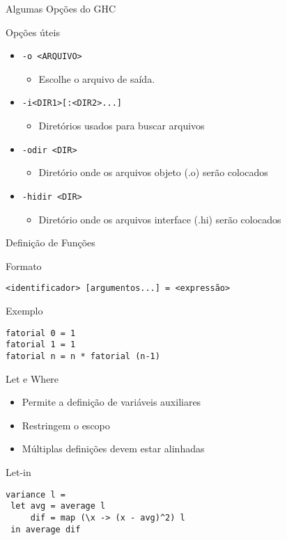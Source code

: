 \documentclass{beamer}
\begin{document}
		 
		 \begin{frame}[fragile]{Algumas Opções do GHC}
		 
		 \begin{block}{Opções úteis}
		  \begin{itemize}
		   \item \verb+-o <ARQUIVO>+
				\begin{itemize}
				 \item Escolhe o arquivo de saída.
				\end{itemize}
		   \item \verb+-i<DIR1>[:<DIR2>...]+		   
				\begin{itemize}
				 \item Diretórios usados para buscar arquivos
				\end{itemize}
		   \item \verb+-odir <DIR>+
				\begin{itemize}
				 \item Diretório onde os arquivos objeto (.o) serão colocados
				\end{itemize}
			\item \verb+-hidir <DIR>+
				\begin{itemize}
				 \item Diretório onde os arquivos interface (.hi) serão colocados
				\end{itemize}
		  \end{itemize}
		 \end{block}
		 
		\end{frame}		
		
		\begin{frame}[fragile]{Definição de Funções}
		 \begin{block}{Formato}
		  \begin{lstlisting}
<identificador> [argumentos...] = <expressão>
		  \end{lstlisting}
		 \end{block}
		 
		 \begin{block}{Exemplo}
		  \begin{lstlisting}
fatorial 0 = 1
fatorial 1 = 1
fatorial n = n * fatorial (n-1)
		  \end{lstlisting}
		 \end{block}
		\end{frame}
		
		\begin{frame}[fragile]{Let e Where}
		 \begin{itemize}
		  \item Permite a definição de variáveis auxiliares
		  \item Restringem o escopo
		  \item Múltiplas definições devem estar alinhadas
		 \end{itemize}
		 \begin{block}{Let-in}
		  \begin{lstlisting}
variance l =
 let avg = average l
     dif = map (\x -> (x - avg)^2) l
 in average dif
		  \end{lstlisting}	  
		 \end{block}
		\end{frame}
		
\end{document}

